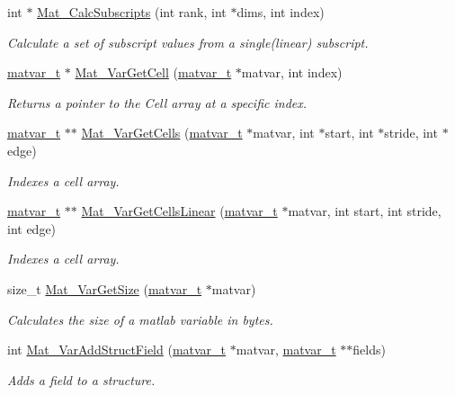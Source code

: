 \begin{DoxyCompactItemize}
int $\ast$ \hyperlink{group__MAT_gabe2571a4b9b6cff3b31aa6f152deba61}{Mat\-\_\-\-Calc\-Subscripts} (int rank, int $\ast$dims, int index)
\begin{DoxyCompactList}\small\item\em Calculate a set of subscript values from a single(linear) subscript. \end{DoxyCompactList}\item 
\hyperlink{structmatvar__t}{matvar\-\_\-t} $\ast$ \hyperlink{group__MAT_gac1e15063439c0bd3eb0c986514c742dc}{Mat\-\_\-\-Var\-Get\-Cell} (\hyperlink{structmatvar__t}{matvar\-\_\-t} $\ast$matvar, int index)
\begin{DoxyCompactList}\small\item\em Returns a pointer to the Cell array at a specific index. \end{DoxyCompactList}\item 
\hyperlink{structmatvar__t}{matvar\-\_\-t} $\ast$$\ast$ \hyperlink{group__MAT_ga0732b0a6c40975b036068b9a14422d45}{Mat\-\_\-\-Var\-Get\-Cells} (\hyperlink{structmatvar__t}{matvar\-\_\-t} $\ast$matvar, int $\ast$start, int $\ast$stride, int $\ast$edge)
\begin{DoxyCompactList}\small\item\em Indexes a cell array. \end{DoxyCompactList}\item 
\hyperlink{structmatvar__t}{matvar\-\_\-t} $\ast$$\ast$ \hyperlink{group__MAT_ga004987d665654409f74eaf8e82bb1380}{Mat\-\_\-\-Var\-Get\-Cells\-Linear} (\hyperlink{structmatvar__t}{matvar\-\_\-t} $\ast$matvar, int start, int stride, int edge)
\begin{DoxyCompactList}\small\item\em Indexes a cell array. \end{DoxyCompactList}\item 
size\-\_\-t \hyperlink{group__MAT_gaeeb798fead2f765bddfb19016c7fdbcc}{Mat\-\_\-\-Var\-Get\-Size} (\hyperlink{structmatvar__t}{matvar\-\_\-t} $\ast$matvar)
\begin{DoxyCompactList}\small\item\em Calculates the size of a matlab variable in bytes. \end{DoxyCompactList}\item 
int \hyperlink{group__MAT_ga9f8ab8a7e4206c16cb20437acc6960d2}{Mat\-\_\-\-Var\-Add\-Struct\-Field} (\hyperlink{structmatvar__t}{matvar\-\_\-t} $\ast$matvar, \hyperlink{structmatvar__t}{matvar\-\_\-t} $\ast$$\ast$fields)
\begin{DoxyCompactList}\small\item\em Adds a field to a structure. \end{DoxyCompactList}\item 
$$
\end{DoxyCompactItemize}

